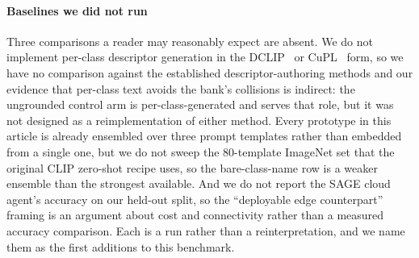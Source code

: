 \documentclass[a4paper,fleqn]{cas-dc}
\begin{document}
\paragraph{Baselines we did not run} Three comparisons a reader may reasonably expect are absent.
We do not implement per-class descriptor generation in the DCLIP~\citep{menon2023} or
CuPL~\citep{pratt2023} form, so we have no comparison against the established
descriptor-authoring methods and our evidence that per-class text avoids the bank's collisions is
indirect: the ungrounded control arm is per-class-generated and serves that role, but it was not
designed as a reimplementation of either method. Every prototype in this article is already
ensembled over three prompt templates rather than embedded from a single one, but we do not sweep
the 80-template ImageNet set that the original CLIP zero-shot recipe uses, so the bare-class-name
row is a weaker ensemble than the strongest available. And we do not report the SAGE cloud agent's accuracy on our
held-out split, so the ``deployable edge counterpart'' framing is an argument about cost and
connectivity rather than a measured accuracy comparison. Each is a run rather than a
reinterpretation, and we name them as the first additions to this benchmark.

\end{document}
